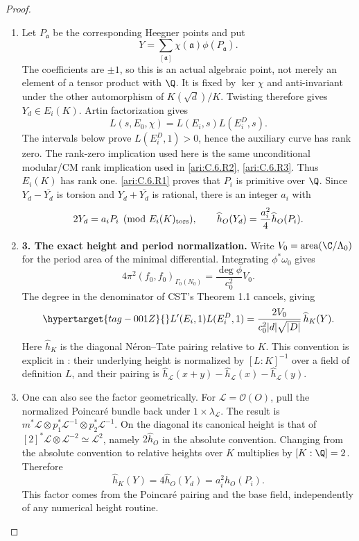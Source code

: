 \begin{proof}
\begin{enumerate}[label=\arabic*.,leftmargin=*]
\item Let $P_{\mathfrak a}$ be the corresponding Heegner points and put
\[
 Y=\sum_{[\mathfrak a]}\chi(\mathfrak a)\phi(P_{\mathfrak a}).
\]
The coefficients are $\pm1$, so this is an actual algebraic point,
not merely an element of a tensor product with $\Q$. It is fixed
by $\ker\chi$ and anti-invariant under the other automorphism of
$K(\sqrt d)/K$. Twisting therefore gives $Y_d\in E_i(K)$.
Artin factorization gives
\[
 L(s,E_0,\chi)=L(E_i,s)L(E_i^D,s).
\]
The intervals below prove $L(E_i^D,1)>0$, hence the auxiliary
curve has rank zero. The rank-zero implication used here is the
same unconditional modular/CM rank implication used in \cref{ari:C.6.R2}, \cref{ari:C.6.R3}.
Thus $E_i(K)$ has rank one. \ref{ari:C.6.R1} proves that $P_i$ is primitive
over $\Q$. Since $Y_d-\overline{Y_d}$ is torsion and
$Y_d+\overline{Y_d}$ is rational, there is an integer $a_i$ with
\[
 2Y_d=a_iP_i\pmod{E_i(K)_{\rm tors}},\qquad
 \widehat h_O(Y_d)=\frac{a_i^2}{4}\widehat h_O(P_i).
\]

\item \textbf{3. The exact height and period normalization.}
Write $V_0=\operatorname{area}(\C/\Lambda_0)$ for the period area
of the minimal differential. Integrating $\phi^*\omega_0$ gives
\[
 4\pi^2(f_0,f_0)_{\Gamma_0(N_0)}
   =\frac{\deg\phi}{c_0^2}V_0.
\]
The degree in the denominator of CST's Theorem 1.1 cancels, giving
\begin{equation}\hypertarget{tag-001Z}{}\label{ari:eq:Cgz-product}
 L'(E_i,1)L(E_i^D,1)
  =\frac{2V_0}{c_0^2|d|\sqrt{|D|}}\,\widehat h_K(Y).
\end{equation}
Here $\widehat h_K$ is the diagonal N\'eron--Tate pairing relative
to $K$. This convention is explicit in
\citet[\S7.1.1, pp.~218--219, Theorem 7.1.2]{CgzYZZ2011}:
their underlying height is normalized by $[L:K]^{-1}$ over a
field of definition $L$, and their pairing is
$\widehat h_{\mathcal L}(x+y)-\widehat h_{\mathcal L}(x)
-\widehat h_{\mathcal L}(y)$.

\item One can also see the factor geometrically. For
$\mathcal L=\mathcal O(O)$, pull the normalized Poincar\'e bundle
back under $1\times\lambda_{\mathcal L}$. The result is
$m^*\mathcal L\otimes p_1^*\mathcal L^{-1}\otimes
p_2^*\mathcal L^{-1}$. On the diagonal its canonical height is
that of $[2]^*\mathcal L\otimes\mathcal L^{-2}\simeq
\mathcal L^2$, namely $2\widehat h_O$ in the absolute convention.
Changing from the absolute convention to relative heights over
$K$ multiplies by $[K:\Q]=2$. Therefore
\[
 \widehat h_K(Y)=4\widehat h_O(Y_d)
                =a_i^2\widehat h_O(P_i).
\]
This factor comes from the Poincar\'e pairing and the base field,
independently of any numerical height routine.


\end{enumerate}
\end{proof}
